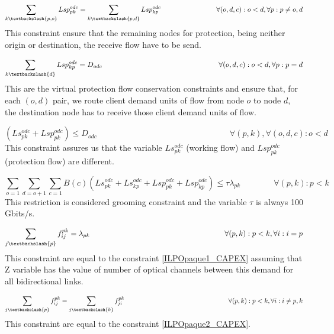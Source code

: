 \begin{equation}
\sum_{k\textbackslash \{p,o\}} Lsp_{pk}^{odc} = \sum_{k\textbackslash \{p,d\}} Lsp_{kp}^{odc} \qquad \qquad \qquad \qquad
\forall(o,d,c) : o < d, \forall p: p \neq o,d
\label{ILPTranslucp2p}
\end{equation}
\noindent
This constraint ensure that the remaining nodes for protection, being neither origin or destination, the receive flow have to be send.

\begin{equation}
\sum_{k\textbackslash \{d\}} Lsp_{kp}^{odc} = D_{odc} \qquad \qquad \qquad \qquad \qquad \qquad \qquad \qquad
\forall(o,d,c) : o < d, \forall p: p = d
\label{ILPTranslucp3p}
\end{equation}
\noindent
This are the virtual protection flow conservation constraints and ensure that, for each $(o,d)$ pair, we route client demand units of flow from node $o$ to node $d$, the destination node has to receive those client demand units of flow.

\begin{equation}
(Ls_{pk}^{odc} + Lsp_{pk}^{odc}) \leq D_{odc} \qquad \qquad \qquad \qquad \qquad \qquad \qquad \qquad
\forall (p,k), \forall(o,d,c) : o < d
\label{ILPTranslucpX}
\end{equation}
\noindent
This constraint assures us that the variable $Ls_{pk}^{odc}$ (working flow) and $Lsp_{pk}^{odc}$ (protection flow) are different.

\begin{equation}
\sum_{o=1} \sum_{d=o+1} \sum_{c=1} B(c)(Ls_{pk}^{odc} + Ls_{kp}^{odc} + Lsp_{pk}^{odc} + Lsp_{kp}^{odc}) \leq  \tau \lambda_{pk} \qquad \qquad
\forall (p,k) : p < k
\label{ILPTranslucp4}
\end{equation}
\noindent
This restriction is considered grooming constraint and the variable $\tau$ is always 100 Gbits/s.

\begin{equation}
\sum_{j\textbackslash \{p\}} f_{ij}^{pk} = \lambda_{pk}  \qquad \qquad \qquad \qquad \qquad \qquad \qquad \qquad \qquad
\forall(p,k) : p < k, \forall i: i = p
\label{ILPTranslucp6}
\end{equation}
\noindent
This constraint are equal to the constraint \ref{ILPOpaque1_CAPEX} assuming that Z variable has the value of number of optical channels between this demand for all bidirectional links.

\begin{equation}
\sum_{j\textbackslash \{p\}} f_{ij}^{pk} = \sum_{j\textbackslash \{k\}} f_{ji}^{pk} \qquad \qquad \qquad \qquad \qquad \qquad \qquad \qquad
\forall(p,k) : p < k, \forall i: i \neq p,k
\label{ILPTranslucp7}
\end{equation}
\noindent
This constraint are equal to the constraint \ref{ILPOpaque2_CAPEX}.

